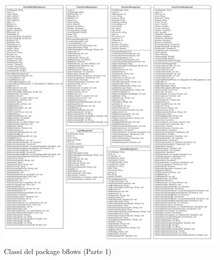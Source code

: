 	\begin{figure}[h]
		\centering
		\includegraphics[width=1\textwidth]
		{immagini/c-bflows-p1}
		
		\caption{Classi del package bflows (Parte 1)}
		\label{c-bflows-p1}
	\end{figure}
	
